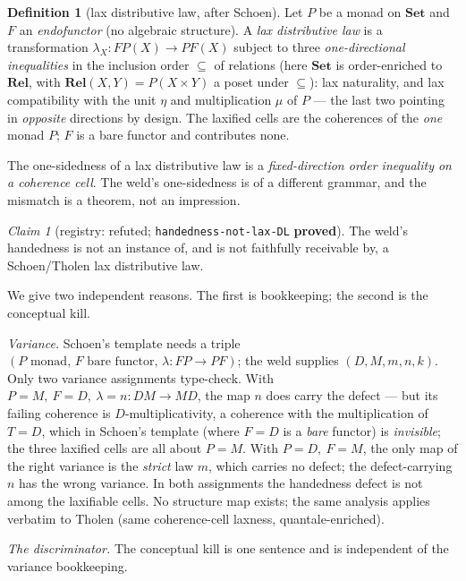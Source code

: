 \documentclass[11pt]{amsart}
\theoremstyle{plain}
\theoremstyle{definition}
\newtheorem{definition}[theorem]{Definition}
\theoremstyle{remark}
\newtheorem{claim}[theorem]{Claim}
\newcommand{\Set}{\mathbf{Set}}
\newcommand{\Rel}{\mathbf{Rel}}
\begin{document}
\begin{definition}[lax distributive law, after Schoen]
Let $P$ be a monad on $\Set$ and $F$ an \emph{endofunctor} (no algebraic structure). A \emph{lax
distributive law} is a transformation $\lambda_{X}\colon FP(X)\to PF(X)$ subject to three
\emph{one-directional inequalities} in the inclusion order $\subseteq$ of relations (here $\Set$ is
order-enriched to $\Rel$, with $\Rel(X,Y)=P(X\times Y)$ a poset under $\subseteq$): lax naturality,
and lax compatibility with the unit $\eta$ and multiplication $\mu$ of $P$ --- the last two pointing
in \emph{opposite} directions by design. The laxified cells are the coherences of the \emph{one}
monad $P$; $F$ is a bare functor and contributes none.
\end{definition}

The one-sidedness of a lax distributive law is a \emph{fixed-direction order inequality on a
coherence cell}. The weld's one-sidedness is of a different grammar, and the mismatch is a theorem,
not an impression.

\begin{claim}[registry: refuted; \texttt{handedness-not-lax-DL} \textbf{proved}]
\label{clm:laxdl}
The weld's handedness is not an instance of, and is not faithfully receivable by, a Schoen/Tholen lax
distributive law.
\end{claim}

We give two independent reasons. The first is bookkeeping; the second is the conceptual kill.

\emph{Variance.} Schoen's template needs a triple $(P\text{ monad},\,F\text{ bare functor},\,
\lambda\colon FP\to PF)$; the weld supplies $(D,M,m,n,k)$. Only two variance assignments type-check.
With $P=M,\ F=D,\ \lambda=n\colon DM\to MD$, the map $n$ does carry the defect --- but its failing
coherence is $D$-multiplicativity, a coherence with the multiplication of $T=D$, which in Schoen's
template (where $F=D$ is a \emph{bare} functor) is \emph{invisible}; the three laxified cells are all
about $P=M$. With $P=D,\ F=M$, the only map of the right variance is the \emph{strict} law $m$, which
carries no defect; the defect-carrying $n$ has the wrong variance. In both assignments the handedness
defect is not among the laxifiable cells. No structure map exists; the same analysis applies verbatim
to Tholen (same coherence-cell laxness, quantale-enriched).

\emph{The discriminator.} The conceptual kill is one sentence and is independent of the variance
bookkeeping.
\end{document}
